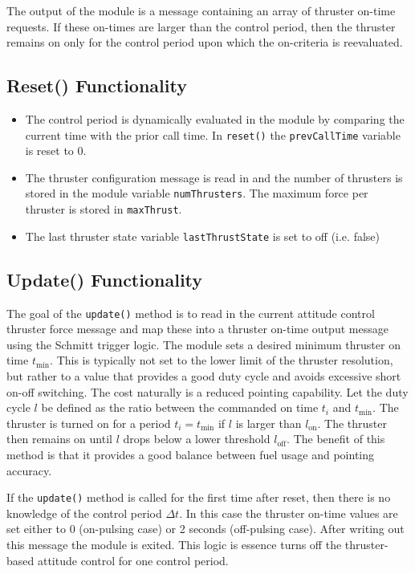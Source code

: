 The output of the module is a message containing an array of thruster on-time requests.  If these on-times are larger than the control period, then the thruster remains on only for the control period upon which the on-criteria is reevaluated.  


\subsection{Reset() Functionality}
\begin{itemize}
	\item The control period is dynamically evaluated in the module by comparing the current time with the prior call time.  In {\tt reset()} the {\tt prevCallTime} variable is reset to 0.  
	\item The thruster configuration message is read in and the number of thrusters is stored in the module variable {\tt numThrusters}.  The maximum force per thruster is stored in {\tt maxThrust}.
	\item The last thruster state variable {\tt lastThrustState} is set to off (i.e. false)
\end{itemize}

\subsection{Update() Functionality}
The goal of the {\tt update()} method is to read in the current attitude control thruster force message and map these into a thruster on-time output message using the Schmitt trigger logic.\cite{Alcorn:2016rz}  The module sets a desired minimum thruster on time $t_{\text{min}}$.  This is typically not set to the lower limit of the thruster resolution, but rather to a value that provides a good duty cycle and avoids excessive short on-off switching.   The cost naturally is a reduced pointing capability.  Let the duty cycle $l$ be defined as the ratio between the commanded on time $t_{i}$ and $t_{\text{min}}$.  The thruster is turned on for a period $t_{i} = t_{\text{min}}$ if $l$ is larger than  $l_{\text{on}}$.  The thruster then remains on until $l$ drops below a lower threshold $l_{\text{off}}$.  The benefit of this method is that it provides a good balance between fuel usage and pointing accuracy.\cite{Alcorn:2016rz}


If the {\tt update()} method is called for the first time after reset, then there is no knowledge of the control period $\Delta t$.  In this case the thruster on-time values are set either to 0 (on-pulsing case) or 2 seconds (off-pulsing case).  After writing out this message the module is exited.  This logic is essence turns off the thruster-based attitude control for one control period. 

